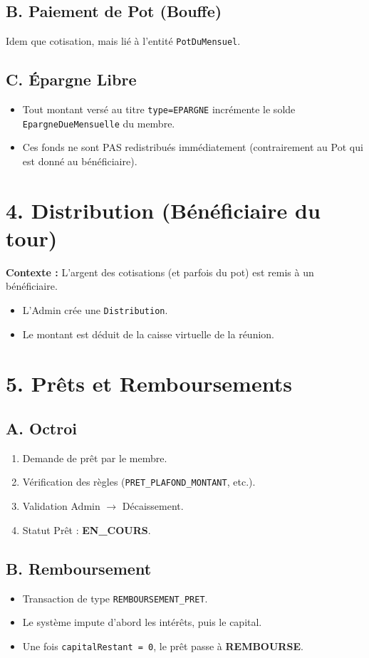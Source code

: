 \documentclass[12pt,a4paper]{report}
\begin{document}
\subsection{B. Paiement de Pot (Bouffe)}
Idem que cotisation, mais lié à l'entité \texttt{PotDuMensuel}.

\subsection{C. Épargne Libre}
\begin{itemize}
    \item Tout montant versé au titre \texttt{type=EPARGNE} incrémente le solde \texttt{EpargneDueMensuelle} du membre.
    \item Ces fonds ne sont PAS redistribués immédiatement (contrairement au Pot qui est donné au bénéficiaire).
\end{itemize}

\section{4. Distribution (Bénéficiaire du tour)}
\textbf{Contexte :} L'argent des cotisations (et parfois du pot) est remis à un bénéficiaire.
\begin{itemize}
    \item L'Admin crée une \texttt{Distribution}.
    \item Le montant est déduit de la caisse virtuelle de la réunion.
\end{itemize}

\section{5. Prêts et Remboursements}
\subsection{A. Octroi}
\begin{enumerate}
    \item Demande de prêt par le membre.
    \item Vérification des règles (\texttt{PRET\_PLAFOND\_MONTANT}, etc.).
    \item Validation Admin $\rightarrow$ Décaissement.
    \item Statut Prêt : \textbf{EN\_COURS}.
\end{enumerate}

\subsection{B. Remboursement}
\begin{itemize}
    \item Transaction de type \texttt{REMBOURSEMENT\_PRET}.
    \item Le système impute d'abord les intérêts, puis le capital.
    \item Une fois \texttt{capitalRestant = 0}, le prêt passe à \textbf{REMBOURSE}.
\end{itemize}
\end{document}
